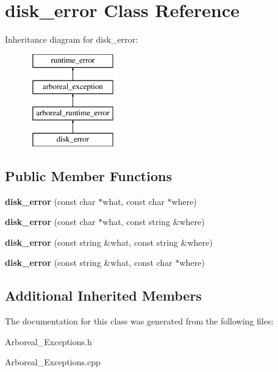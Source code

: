 \hypertarget{classdisk__error}{}\section{disk\+\_\+error Class Reference}
\label{classdisk__error}
Inheritance diagram for disk\+\_\+error\+:\begin{figure}[H]
\begin{center}
\leavevmode
\includegraphics[height=4.000000cm]{classdisk__error}
\end{center}
\end{figure}
\subsection*{Public Member Functions}
\begin{DoxyCompactItemize}
\item 
\mbox{\label{classdisk__error_a1f3a9f8326a8d192d3a54e698d09d29d}} 
{\bfseries disk\+\_\+error} (const char $\ast$what, const char $\ast$where)
\item 
\mbox{\label{classdisk__error_a03937aabd05ba77b2e49fff4c039b047}} 
{\bfseries disk\+\_\+error} (const char $\ast$what, const string \&where)
\item 
\mbox{\label{classdisk__error_afb8e69ac35d47d5ed1bcc8b764baea4b}} 
{\bfseries disk\+\_\+error} (const string \&what, const string \&where)
\item 
\mbox{\label{classdisk__error_aea5a9df17b57607f55f82de0cd384052}} 
{\bfseries disk\+\_\+error} (const string \&what, const char $\ast$where)
\end{DoxyCompactItemize}
\subsection*{Additional Inherited Members}


The documentation for this class was generated from the following files\+:\begin{DoxyCompactItemize}
\item 
Arboreal\+\_\+\+Exceptions.\+h\item 
Arboreal\+\_\+\+Exceptions.\+cpp\end{DoxyCompactItemize}
